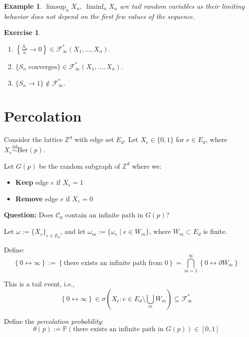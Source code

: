 \documentclass{article}
\newcommand{\1}{\mathds{1}}
\newcommand{\F}{\mathcal{F}}
\newcommand{\lf}{\left}
\newcommand{\rg}{\right}
\newcommand{\f}[2]{\frac{#1}{#2}}
\newtheorem{example}{Example}
\newtheorem{exercise}{Exercise}
\begin{document}
\begin{example}
    $\limsup_n X_n,\ \liminf_n X_n$ are tail random variables as their limiting behavior does not depend on the first few values of the sequence.
\end{example}
\begin{exercise}
\begin{enumerate}
    \item $\lf\{\f{S_n}n\to 0\rg\}\in\F_\infty^*(X_1,\ldots,X_n).$
    \item $\{S_n\text{ converges}\}\in\F_\infty^*(X_1,\ldots,X_n).$
    \item $\{S_n\to 1\}\not\in\F_\infty^*.$
\end{enumerate}
\end{exercise}
\section*{Percolation}

Consider the lattice \( \mathbb{Z}^d \) with edge set \( E_d \).  
Let \( X_e \in \{0,1\} \) for \( e \in E_d \), where \( X_e \overset{\text{iid}}{\sim} \text{Ber}(p) \).

Let \( G(p) \) be the random subgraph of \( \mathbb{Z}^d \) where we:

\begin{itemize}
  \item \textbf{Keep} edge \( e \) if \( X_e = 1 \)
  \item \textbf{Remove} edge \( e \) if \( X_e = 0 \)
\end{itemize}

\bigskip

\textbf{Question:} Does \( \mathcal{C}_0 \) contain an infinite path in \( G(p) \)?  

Let \( \omega := \{ X_e \}_{e \in E_d} \), and let \( \omega_m := \{ \omega_e \mid e \in W_m \} \), where \( W_m \subset E_d \) is finite.

Define:
\[
\left\{ 0 \leftrightarrow \infty \right\} := \left\{ \text{there exists an infinite path from } 0 \right\}
= \bigcap_{m=1}^\infty \left\{ 0 \leftrightarrow \partial W_m \right\}
\]

This is a tail event, i.e.,
\[
\left\{ 0 \leftrightarrow \infty \right\} \in \sigma\left( X_e : e \in E_d \setminus \bigcup_m W_m \right) \subseteq \mathcal{F}_\infty^*
\]

\bigskip

Define the \textit{percolation probability}:
\[
\theta(p) := \mathbb{P}( \text{there exists an infinite path in } G(p) ) \in [0,1]
\]
\end{document}
